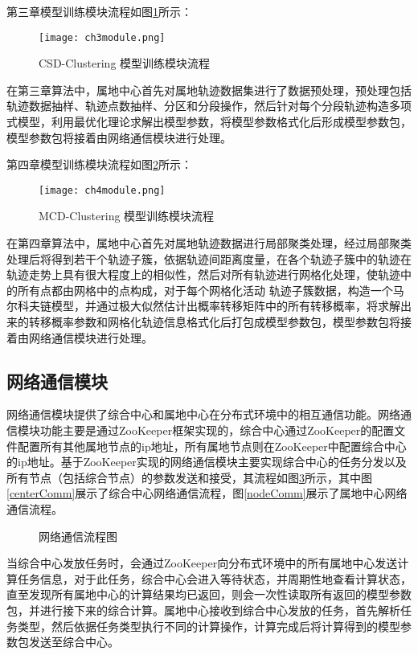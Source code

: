 第三章模型训练模块流程如图\ref{ch3module}所示：
\begin{figure}[H]
	\texttt{[image: ch3module.png]}
	\caption{CSD-Clustering 模型训练模块流程}
	\label{ch3module}
\end{figure}

在第三章算法中，属地中心首先对属地轨迹数据集进行了数据预处理，预处理包括轨迹数据抽样、轨迹点数抽样、分区和分段操作，然后针对每个分段轨迹构造多项式模型，利用最优化理论求解出模型参数，将模型参数格式化后形成模型参数包，模型参数包将接着由网络通信模块进行处理。

第四章模型训练模块流程如图\ref{ch4module}所示：
\begin{figure}[H]
	\texttt{[image: ch4module.png]}
	\caption{MCD-Clustering 模型训练模块流程}
	\label{ch4module}
\end{figure}

在第四章算法中，属地中心首先对属地轨迹数据进行局部聚类处理，经过局部聚类处理后将得到若干个轨迹子簇，依据轨迹间距离度量，在各个轨迹子簇中的轨迹在轨迹走势上具有很大程度上的相似性，然后对所有轨迹进行网格化处理，使轨迹中的所有点都由网格中的点构成，对于每个网格化活动 轨迹子簇数据，构造一个马尔科夫链模型，并通过极大似然估计出概率转移矩阵中的所有转移概率，将求解出来的转移概率参数和网格化轨迹信息格式化后打包成模型参数包，模型参数包将接着由网络通信模块进行处理。

\subsection{网络通信模块}

网络通信模块提供了综合中心和属地中心在分布式环境中的相互通信功能。网络通信模块功能主要是通过ZooKeeper框架实现的，综合中心通过ZooKeeper的配置文件配置所有其他属地节点的ip地址，所有属地节点则在ZooKeeper中配置综合中心的ip地址。基于ZooKeeper实现的网络通信模块主要实现综合中心的任务分发以及所有节点（包括综合节点）的参数发送和接受，其流程如图\ref{comm}所示，其中图\ref{centerComm}展示了综合中心网络通信流程，图\ref{nodeComm}展示了属地中心网络通信流程。
\begin{figure}[H]
\caption{网络通信流程图}
\label{comm}
\end{figure}

当综合中心发放任务时，会通过ZooKeeper向分布式环境中的所有属地中心发送计算任务信息，对于此任务，综合中心会进入等待状态，并周期性地查看计算状态，直至发现所有属地中心的计算结果均已返回，则会一次性读取所有返回的模型参数包，并进行接下来的综合计算。属地中心接收到综合中心发放的任务，首先解析任务类型，然后依据任务类型执行不同的计算操作，计算完成后将计算得到的模型参数包发送至综合中心。

